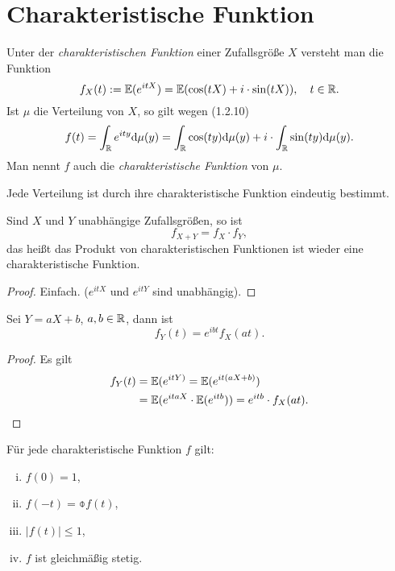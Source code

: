 \section{Charakteristische Funktion}
\begin{prgp}
  Unter der \emph{charakteristischen Funktion} einer Zufallsgröße $X$ versteht
  man die Funktion
  \[ f_X(t) := \mathbb{E}( e^{itX}) = \mathbb{E}( \cos(tX) + i \cdot \sin( tX ) ), \quad t
    \in \mathbb{R}. \]
  Ist $\mu$ die Verteilung von $X$, so gilt wegen (1.2.10)
  \[ f(t) = \int_{\mathbb{R}} e^{ity} \mathrm{d} \mu(y) =
    \int_{\mathbb{R}} \cos (ty) \mathrm{d} \mu(y)
    + i \cdot \int_{\mathbb{R}} \sin(ty) \mathrm{d} \mu(y). \]
  Man nennt $f$ auch die \emph{charakteristische Funktion} von $\mu$.
\end{prgp}

\begin{thm}
  Jede Verteilung ist durch ihre charakteristische Funktion eindeutig bestimmt.
\end{thm}

\begin{thm}
  Sind $X$ und $Y$ unabhängige Zufallsgrößen, so ist
  \[ f_{X+Y} = f_X \cdot f_Y, \]
  das heißt das Produkt von charakteristischen Funktionen ist wieder eine
  charakteristische Funktion.
\end{thm}

\begin{proof}
  Einfach. ($e^{itX}$ und $e^{itY}$ sind unabhängig).
\end{proof}

\begin{thm}
  Sei $Y = aX + b$, $a,b \in \mathbb{R}$, dann ist
  \[ f_Y(t) = e^{ibt} f_X(at). \]
\end{thm}

\begin{proof}
  Es gilt
  \begin{align*}
    f_Y(t)
    &= \mathbb{E}(e^{itY)} = \mathbb{E}( e^{it(aX+b)}) \\
    &= \mathbb{E}( e^{itaX} \cdot \mathbb{E}( e^{itb} ) )
      = e^{itb} \cdot f_X(at). \qedhere
  \end{align*}
\end{proof}

\clearpage

\begin{thm}
  Für jede charakteristische Funktion $f$ gilt:
  \begin{enumerate}[i)]
  \item $f(0) = 1$,
  \item $f(-t) = \obar{f(t)}$,
  \item $|f(t)| \le 1$,
  \item $f$ ist gleichmäßig stetig.
  \end{enumerate}
\end{thm}

